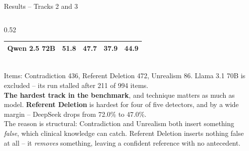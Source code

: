 \documentclass[aspectratio=169,11pt]{beamer}
\begin{document}
\begin{frame}[shrink=12]{Results \;--\; Tracks 2 and 3}
{\begin{columns}[T]
\begin{column}{0.52\textwidth}
\begin{tabular}{@{}lrrrr@{}}
Qwen 2.5 72B & 51.8 & 47.7 & 37.9 & 44.9\\
\bottomrule
\end{tabular}\\[1mm]
{\scriptsize Items: Contradiction 436, Referent Deletion 472, Unrealism 86. Llama 3.1 70B is excluded -- its run stalled after 211 of 994 items.}\\[2.5mm]
{\scriptsize\textbf{The hardest track in the benchmark}, and technique matters as much as model. \textbf{Referent Deletion} is hardest for four of five detectors, and by a wide margin -- DeepSeek drops from 72.0\% to 47.0\%.\\[1.5mm]
The reason is structural: Contradiction and Unrealism both insert something \emph{false}, which clinical knowledge can catch. Referent Deletion inserts nothing false at all -- it \emph{removes} something, leaving a confident reference with no antecedent.}
\end{column}
\end{columns}
}
\end{frame}
\end{document}
